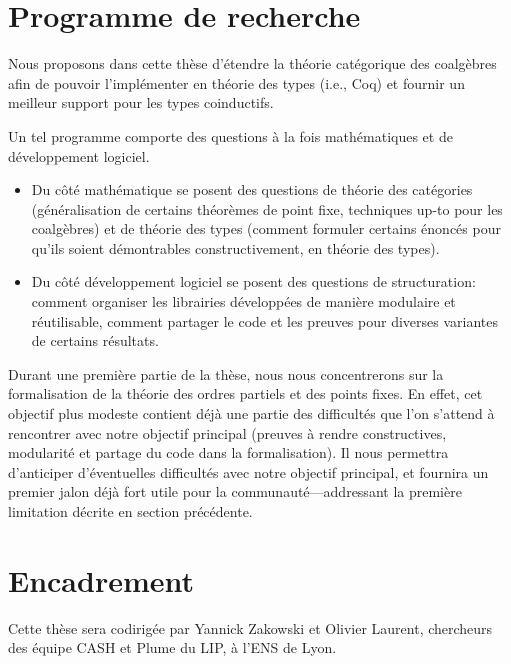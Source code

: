 \documentclass[a4paper,11pt]{article}
\begin{document}
\section{Programme de recherche}

Nous proposons dans cette thèse d'étendre la théorie catégorique des coalgèbres afin de pouvoir l'implémenter en théorie des types (i.e., Coq) et fournir un meilleur support pour les types coinductifs.

Un tel programme comporte des questions à la fois mathématiques et de développement logiciel.
\begin{itemize}
\item Du côté mathématique se posent des questions de théorie des catégories (généralisation de certains théorèmes de point fixe, techniques up-to pour les coalgèbres) et de théorie des types (comment formuler certains énoncés pour qu'ils soient démontrables constructivement, en théorie des types).
\item Du côté développement logiciel se posent des questions de structuration: comment organiser les librairies développées de manière modulaire et réutilisable, comment partager le code et les preuves pour diverses variantes de certains résultats. 
\end{itemize}

Durant une première partie de la thèse, nous nous concentrerons sur la
formalisation de la théorie des ordres partiels et des points fixes. En effet,
cet objectif plus modeste contient déjà une partie des difficultés que l'on
s'attend à rencontrer avec notre objectif principal (preuves à rendre
constructives, modularité et partage du code dans la formalisation). Il nous
permettra d'anticiper d'éventuelles difficultés avec notre objectif principal,
et fournira un premier jalon déjà fort utile pour la communauté---addressant la
première limitation décrite en section précédente.

\section{Encadrement}

Cette thèse sera codirigée par Yannick Zakowski et Olivier Laurent, chercheurs des équipe CASH et Plume du LIP, à l'ENS de Lyon.



\end{document}
